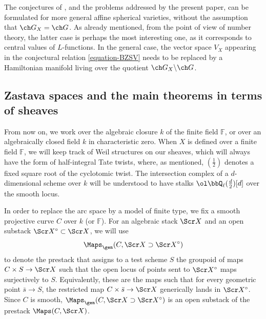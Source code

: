 The conjectures of \cite{BZSV}, and the problems addressed by the present paper, can be formulated for more general affine spherical varieties, without the assumption that $\ch G_X = \ch G$. As already mentioned, from the point of view of number theory, the latter case is perhaps the most interesting one, as it corresponds to central values of $L$-functions. In the general case, the vector space $V_X$ appearing in the conjectural relation \eqref{equation-BZSV} needs to be replaced by a Hamiltonian manifold living over the quotient $\ch G_X\backslash \ch G$.


\subsection{Zastava spaces and the main theorems in terms of sheaves}
\label{subsection-introduction-global}

From now on, we work over the algebraic closure $k$ of the finite field $\mathbb F$, or over an algebraically closed field $k$ in characteristic zero. When $X$ is defined over a finite field $\mathbb F$, we will keep track of Weil structures on our sheaves, which will always have the form of half-integral Tate twists, where, as mentioned, $(\frac{1}{2})$ denotes a fixed square root of the cyclotomic twist. The intersection complex of a $d$-dimensional scheme over $k$ will be understood to have stalks $\ol\bbQ_\ell (\frac{d}{2})[d]$ over the smooth locus.

In order to replace the arc space by a model of finite type, we fix a smooth projective curve $C$ over $k$ (or $\mathbb F$). For an algebraic stack $\Scr X$ and an open substack $\Scr X^\circ \subset \Scr X$,
we will use
\[ \Maps_\gen(C, \Scr X \supset \Scr X^\circ) \]
to denote the prestack that assigns to a test scheme $S$
the groupoid of maps $C\times S \to \Scr X$
such that the open locus of points sent to $\Scr X^\circ$
maps surjectively to $S$.
Equivalently, these are the maps such that for every geometric point $\bar s \to S$,
the restricted map $C\times \bar s \to \Scr X$ generically lands in $\Scr X^\circ$.
Since $C$ is smooth, $\Maps_\gen(C, \Scr X \supset \Scr X^\circ)$ is
an open substack of the prestack $\Maps(C,\Scr X)$.



